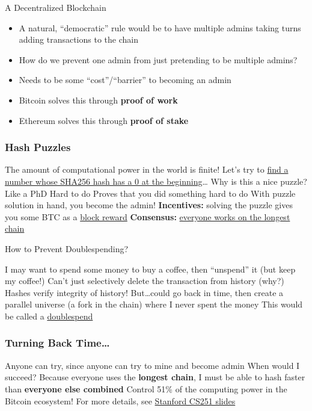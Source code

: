 \documentclass[aspectratio=169]{beamer}
\begin{document}
\begin{frame}{A Decentralized Blockchain}

\begin{itemize}
    \item  A natural, “democratic” rule would be to have multiple admins taking turns adding transactions to the chain \pause 
    \item How do we prevent one admin from just pretending to be multiple admins? \pause 
    \item Needs to be some “cost”/“barrier” to becoming an admin \pause 
    \item Bitcoin solves this through \textbf{proof of work}
    \item Ethereum solves this through \textbf{proof of stake}
\end{itemize}
    
\end{frame}


\begin{frame}
\frametitle{Hash Puzzles}

\bi
\m The amount of computational power in the world is finite!
\m Let's try to \href{https://emn178.github.io/online-tools/sha256.html}{find a number whose SHA256 hash has a 0 at the beginning}\ldots \pause 
\m Why is this a nice puzzle? Like a PhD
\be
\m Hard to do
\m Proves that you did something hard to do \pause 
\ee
\m With puzzle solution in hand, you become the admin!
\m \textbf{Incentives:} solving the puzzle gives you some BTC as a \ul{block reward}
\m \textbf{Consensus:} \ul{everyone works on the longest chain} 
\ei

\end{frame}



\begin{frame}{How to Prevent Doublespending?}
    
\bi
\m I may want to spend some money to buy a coffee, then ``unspend'' it (but keep my coffee!)
\m Can't just selectively delete the transaction from history (why?)\pause 
\bi
\m Hashes verify integrity of history!
\ei
\m But\ldots could go back in time, then create a parallel universe (a fork in the chain) where I never spent the money 
\bi
\m This would be called a \ul{doublespend}
\ei
\ei

\end{frame}

\begin{frame}
\frametitle{Turning Back Time\ldots}

\bi
\m Anyone can try, since anyone can try to mine and become admin
\m When would I succeed? \pause
\bi
\m Because everyone uses the \textbf{longest chain}, I must be able to hash faster than \textbf{everyone else combined}
\m Control 51\% of the computing power in the Bitcoin ecosystem!
\ei
\m For more details, see \href{https://cs251.stanford.edu/lectures/lecture5.pdf}{Stanford CS251 slides}
\ei

\end{frame}
\end{document}

